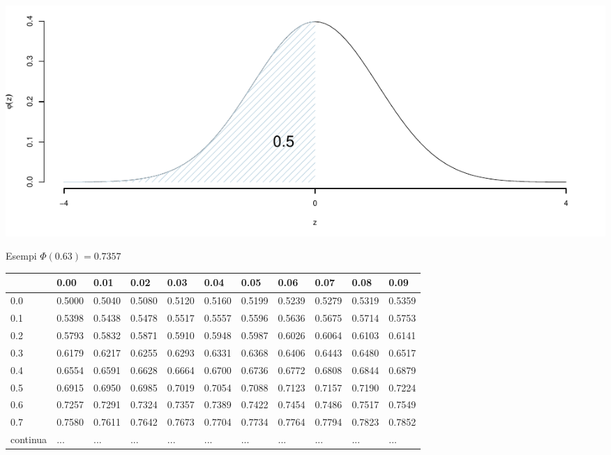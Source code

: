 \documentclass[
  11pt,
]{book}
\theoremstyle{mytheoremstyle}
\theoremstyle{mydefstyle}
\begin{document}
\begin{center}\includegraphics{Appunti_di_Statistica_2025_files/figure-latex/07c-Normale-12-1} \end{center}

Esempi \(\Phi(0.63)=0.7357\)

\begin{tabular}{llll|>{}l|llllll}
\toprule
  & 0.00 & 0.01 & 0.02 & 0.03 & 0.04 & 0.05 & 0.06 & 0.07 & 0.08 & 0.09\\
\midrule
0.0 & 0.5000 & 0.5040 & 0.5080 & \textcolor[HTML]{AB292E}{0.5120} & 0.5160 & 0.5199 & 0.5239 & 0.5279 & 0.5319 & 0.5359\\
0.1 & 0.5398 & 0.5438 & 0.5478 & \textcolor[HTML]{AB292E}{0.5517} & 0.5557 & 0.5596 & 0.5636 & 0.5675 & 0.5714 & 0.5753\\
0.2 & 0.5793 & 0.5832 & 0.5871 & \textcolor[HTML]{AB292E}{0.5910} & 0.5948 & 0.5987 & 0.6026 & 0.6064 & 0.6103 & 0.6141\\
0.3 & 0.6179 & 0.6217 & 0.6255 & \textcolor[HTML]{AB292E}{0.6293} & 0.6331 & 0.6368 & 0.6406 & 0.6443 & 0.6480 & 0.6517\\
0.4 & 0.6554 & 0.6591 & 0.6628 & \textcolor[HTML]{AB292E}{0.6664} & 0.6700 & 0.6736 & 0.6772 & 0.6808 & 0.6844 & 0.6879\\
0.5 & 0.6915 & 0.6950 & 0.6985 & \textcolor[HTML]{AB292E}{0.7019} & 0.7054 & 0.7088 & 0.7123 & 0.7157 & 0.7190 & 0.7224\\
\midrule
\textcolor[HTML]{AB292E}{0.6} & \textcolor[HTML]{AB292E}{0.7257} & \textcolor[HTML]{AB292E}{0.7291} & \textcolor[HTML]{AB292E}{0.7324} & \textcolor[HTML]{AB292E}{0.7357} & \textcolor[HTML]{AB292E}{0.7389} & \textcolor[HTML]{AB292E}{0.7422} & \textcolor[HTML]{AB292E}{0.7454} & \textcolor[HTML]{AB292E}{0.7486} & \textcolor[HTML]{AB292E}{0.7517} & \textcolor[HTML]{AB292E}{0.7549}\\
\midrule
0.7 & 0.7580 & 0.7611 & 0.7642 & \textcolor[HTML]{AB292E}{0.7673} & 0.7704 & 0.7734 & 0.7764 & 0.7794 & 0.7823 & 0.7852\\
continua & ... & ... & ... & \textcolor[HTML]{AB292E}{...} & ... & ... & ... & ... & ... & ...\\
\bottomrule
\end{tabular}
\end{document}
